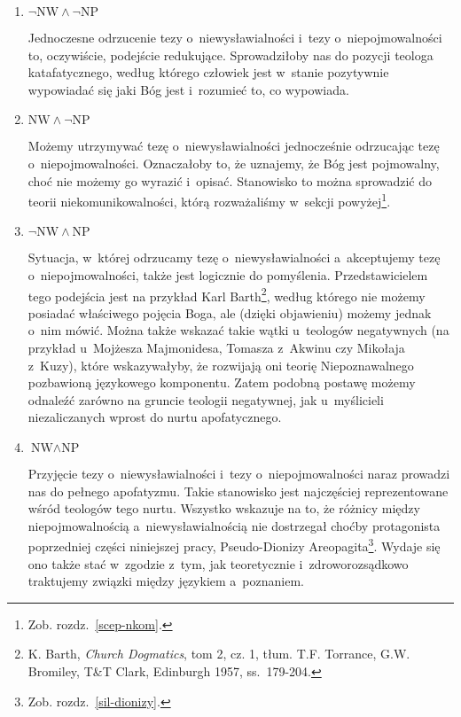 \begin{enumerate}[label = \arabic*), itemindent=6mm, labelwidth=4mm, labelsep=2mm, itemsep=1em, leftmargin=0mm]
\item $\neg \text{NW} \land \neg \text{NP}$

Jednoczesne odrzucenie tezy o~niewysławialności i~tezy o~niepojmowalności to, oczywiście, podejście redukujące. Sprowadziłoby nas do pozycji teologa katafatycznego, według którego człowiek jest w~stanie pozytywnie wypowiadać się jaki Bóg jest i~rozumieć to, co wypowiada.

\item $\text{NW} \land \neg \text{NP}$

Możemy utrzymywać tezę o~niewysławialności jednocześnie odrzucając tezę o~niepojmowalności. Oznaczałoby to, że uznajemy, że Bóg jest pojmowalny, choć nie możemy go wyrazić i~opisać. Stanowisko to można sprowadzić do teorii niekomunikowalności, którą rozważaliśmy w~sekcji powyżej\footnote{Zob. rozdz.~\ref{scep-nkom}.}.

\item $\neg \text{NW} \land \text{NP}$

Sytuacja, w~której odrzucamy tezę o~niewysławialności a~akceptujemy tezę o~niepojmowalności, także jest logicznie do pomyślenia. Przedstawicielem tego podejścia jest na przykład Karl Barth\footnote{K. Barth, \textit{Church Dogmatics}, tom 2, cz. 1, tłum. T.F. Torrance, G.W. Bromiley, T\&T Clark, Edinburgh 1957, ss.~179-204.}, według którego nie możemy posiadać właściwego pojęcia Boga, ale (dzięki objawieniu) możemy jednak o~nim mówić. Można także wskazać takie wątki u~teologów negatywnych (na przykład u~Mojżesza Majmonidesa, Tomasza z~Akwinu czy Mikołaja z~Kuzy), które wskazywałyby, że rozwijają oni teorię Niepoznawalnego pozbawioną językowego komponentu. Zatem podobną postawę możemy odnaleźć zarówno na gruncie teologii negatywnej, jak u~myślicieli niezaliczanych wprost do nurtu apofatycznego.

\item $\text{NW} \land \text{NP}$

Przyjęcie tezy o~niewysławialności i~tezy o~niepojmowalności naraz prowadzi nas do pełnego apofatyzmu. Takie stanowisko jest najczęściej reprezentowane wśród teologów tego nurtu. Wszystko wskazuje na to, że różnicy między niepojmowalnością a~niewysławialnością nie dostrzegał choćby protagonista poprzedniej części niniejszej pracy, Pseudo-Dionizy Areopagita\footnote{Zob. rozdz.~\ref{sil-dionizy}.}. Wydaje się ono także stać w~zgodzie z~tym, jak teoretycznie i~zdroworozsądkowo traktujemy związki między językiem a~poznaniem.
\end{enumerate}

